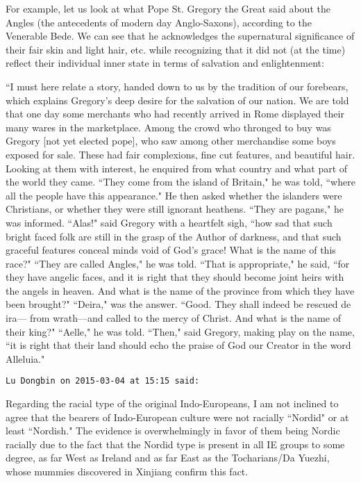 \begin{footnotesize}
\begin{sffamily}
For example, let us look at what Pope St. Gregory the Great said about the Angles (the antecedents of modern day Anglo-Saxons), according to the Venerable Bede. We can see that he acknowledges the supernatural significance of their fair skin and light hair, etc. while recognizing that it did not (at the time) reflect their individual inner state in terms of salvation and enlightenment:

``I must here relate a story, handed down to us by the tradition of our forebears, which explains Gregory's deep desire for the salvation of our nation. We are told that one day some merchants who had recently arrived in Rome displayed their many wares in the marketplace. Among the crowd who thronged to buy was Gregory [not yet elected pope], who saw among other merchandise some boys exposed for sale. These had fair complexions, fine cut features, and beautiful hair. Looking at them with interest, he enquired from what country and what part of the world they came. ``They come from the island of Britain," he was told, ``where all the people have this appearance." He then asked whether the islanders were Christians, or whether they were still ignorant heathens. ``They are pagans," he was informed. ``Alas!" said Gregory with a heartfelt sigh, ``how sad that such bright faced folk are still in the grasp of the Author of darkness, and that such graceful features conceal minds void of God's grace! What is the name of this race?" ``They are called Angles," he was told. ``That is appropriate," he said, ``for they have angelic faces, and it is right that they should become joint heirs with the angels in heaven. And what is the name of the province from which they have been brought?" ``Deira," was the answer. ``Good. They shall indeed be rescued de ira— from wrath—and called to the mercy of Christ. And what is the name of their king?" ``Aelle," he was told. ``Then," said Gregory, making play on the name, ``it is right that their land should echo the praise of God our Creator in the word Alleluia."


\hfill

\texttt{Lu Dongbin on 2015-03-04 at 15:15 said: }

Regarding the racial type of the original Indo-Europeans, I am not inclined to agree that the bearers of Indo-European culture were not racially ``Nordid" or at least ``Nordish." The evidence is overwhelmingly in favor of them being Nordic racially due to the fact that the Nordid type is present in all IE groups to some degree, as far West as Ireland and as far East as the Tocharians/Da Yuezhi, whose mummies discovered in Xinjiang confirm this fact.


\end{sffamily}
\end{footnotesize}
